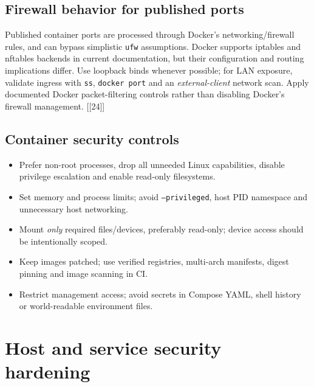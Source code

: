 \documentclass[10pt,oneside,openany]{report}
\newcommand{\code}[1]{\texttt{#1}}
\newcommand{\smallref}[1]{{\sffamily\scriptsize\color{slate}[#1]}}
\begin{document}
\section{Firewall behavior for published ports}
Published container ports are processed through Docker's networking/firewall rules, and can bypass simplistic \code{ufw} assumptions. Docker supports iptables and nftables backends in current documentation, but their configuration and routing implications differ. Use loopback binds whenever possible; for LAN exposure, validate ingress with \code{ss}, \code{docker port} and an \emph{external-client} network scan. Apply documented Docker packet-filtering controls rather than disabling Docker's firewall management. \smallref{[24]}
\section{Container security controls}
\begin{itemize}
\item Prefer non-root processes, drop all unneeded Linux capabilities, disable privilege escalation and enable read-only filesystems.
\item Set memory and process limits; avoid \code{--privileged}, host PID namespace and unnecessary host networking.
\item Mount \emph{only} required files/devices, preferably read-only; device access should be intentionally scoped.
\item Keep images patched; use verified registries, multi-arch manifests, digest pinning and image scanning in CI.
\item Restrict management access; avoid secrets in Compose YAML, shell history or world-readable environment files.
\end{itemize}

\chapter{Host and service security hardening}
\end{document}
